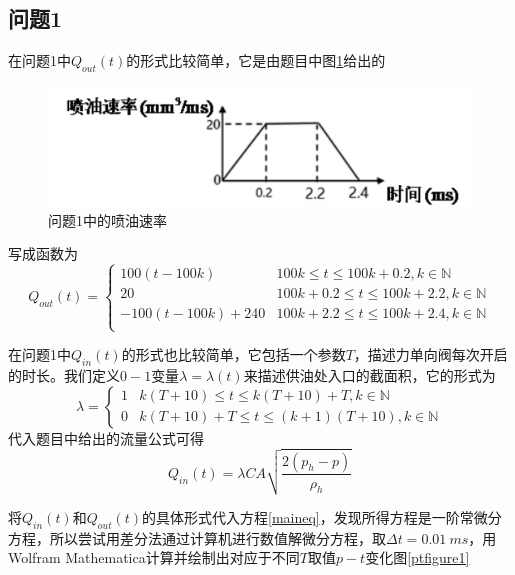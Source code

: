 \documentclass[12pt,AutoFakeBold]{article}%
\begin{document}
    \subsection{问题1}
    在问题1中$Q_{out}(t)$的形式比较简单，它是由题目中图\ref{inputof1}给出的
    \begin{figure}[H]
        \centering
        \includegraphics[scale=0.75]{figure/inputof1.png}
        \caption{问题1中的喷油速率}
        \label{inputof1}
    \end{figure}
    写成函数为
    \begin{equation}
        Q_{out}(t)=
        \begin{cases}
            100(t-100k)&100k\leq t\leq 100k+0.2,k\in\mathbb{N}\\
            20&100k+0.2\leq t\leq 100k+2.2,k\in\mathbb{N}\\
            -100(t-100k)+240&100k+2.2\leq t\leq 100k+2.4,k\in\mathbb{N}\\
        \end{cases}
    \end{equation}\par
    在问题1中$Q_{in}(t)$的形式也比较简单，它包括一个参数$T$，描述力单向阀每次开启的时长。我们定义$0-1$变量$\lambda=\lambda(t)$来描述供油处入口的截面积，它的形式为
    \begin{equation}
        \lambda=
        \begin{cases}
            1 & k(T+10)\leq t\leq k(T+10)+T,k\in\mathbb{N}\\
            0 & k(T+10)+T\leq t\leq (k+1)(T+10),k\in\mathbb{N}
        \end{cases}
    \end{equation}
    代入题目中给出的流量公式可得
    \begin{equation}
        Q_{in}(t)=\lambda CA\sqrt{\frac{2(p_h-p)}{\rho_h}}
    \end{equation}\par
    将$Q_{in}(t)$和$Q_{out}(t)$的具体形式代入方程\ref{maineq}，发现所得方程是一阶常微分方程，所以尝试用差分法通过计算机进行数值解微分方程，取$\Delta t=\SI{0.01}{ms}$，用Wolfram Mathematica计算并绘制出对应于不同$T$取值$p-t$变化图\ref{ptfigure1}
\end{document}
